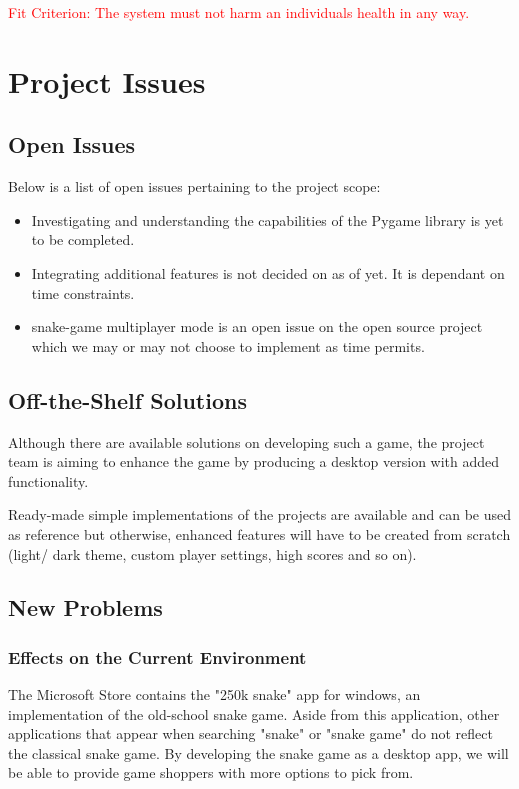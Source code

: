 \documentclass[12pt, titlepage]{article}
\begin{document}
\textcolor{red}{Fit Criterion: The system must not harm an individuals health in any way.}
\section{Project Issues}

\subsection{Open Issues}
Below is a list of open issues pertaining to the project scope:
\begin{itemize}
\item Investigating and understanding the capabilities of the Pygame library is yet to be completed.
\item Integrating additional features is not decided on as of yet. It is dependant on time constraints.
\item snake-game multiplayer mode is an open issue on the open source project which we may or may not choose to implement as time permits.

\end{itemize}
\subsection{Off-the-Shelf Solutions}

Although there are available solutions on developing such a game, the project team is aiming to enhance the game by producing a desktop version with 
added functionality.

Ready-made simple implementations of the projects are available and can be used as reference but otherwise, enhanced features will have to be created from scratch (light/ dark theme, custom player settings, high scores and so on).

\subsection{New Problems}

\subsubsection{Effects on the Current Environment}

The Microsoft Store contains the "250k snake" app for windows, an implementation of the old-school snake game. Aside from this application, other applications that appear when searching "snake" or "snake game" do not reflect the classical snake game. By developing the snake game as a desktop app, we will be able to provide game shoppers with more options to pick from. 
\end{document}
